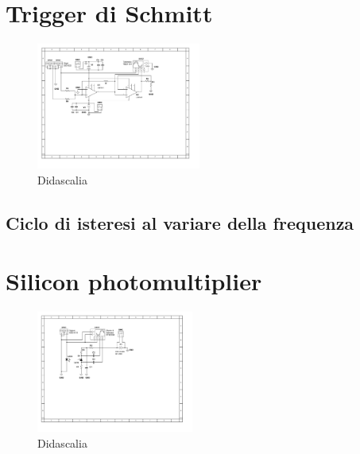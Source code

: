 \documentclass[journal]{IEEEtran}
\begin{document}
\section{Trigger di Schmitt} %

\begin{figure}[H]%
\begin {center}
\includegraphics[width=0.48\textwidth]{sch-simulations/output/OPA-mixer-trigger.pdf}
\caption{Didascalia}
\label{fig:oscilloscope}
\end {center}
\end{figure}

\subsection{Ciclo di isteresi al variare della frequenza} %


\section{Silicon photomultiplier} %

\begin{figure}[H]%
\begin{center}
\includegraphics[width=0.46\textwidth]{sch-simulations/output/SiPM.pdf}
\caption{Didascalia}
\label{fig:oscilloscope}
\end{center}
\end{figure}
\end{document}
